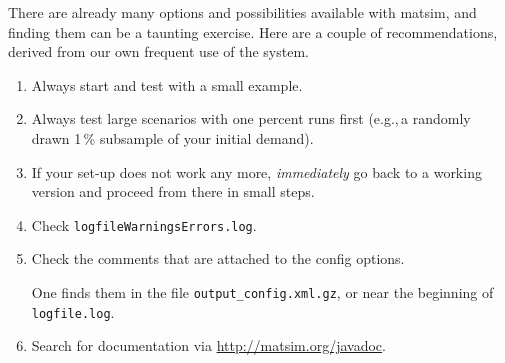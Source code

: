 
There are already many options and possibilities available with \gls{matsim}, and finding them can be a taunting exercise.  Here are a couple of recommendations, derived from our own frequent use of the system.
\begin{enumerate}

\item Always start and test with a small example.

\item Always test large scenarios with one percent runs first (e.g.,\,a randomly drawn 1\,\% subsample of your initial demand). 

\item If your set-up does not work any more, \emph{immediately} go back to a working version and proceed from there in small steps.

\item Check \lstinline{logfileWarningsErrors.log}.

\item Check the comments that are attached to the config options.

One finds them in the file \lstinline{output_config.xml.gz}, or near the beginning of \lstinline{logfile.log}.

\item Search for documentation via \url{http://matsim.org/javadoc}.

\end{enumerate}




